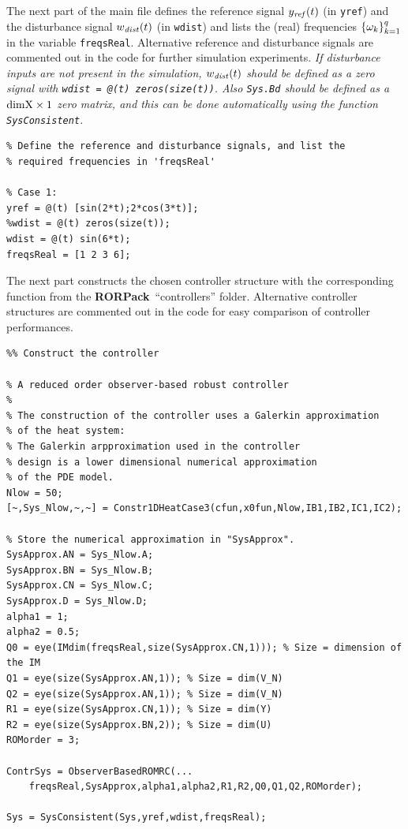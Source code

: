 \documentclass[11pt, a4paper]{amsart}
\theoremstyle{definition}
\numberwithin{equation}{section}
\newcommand{\yref}{y_{\mbox{\scriptsize\textit{ref}}}}
\newcommand{\wdist}{w_{\mbox{\scriptsize\textit{dist}}}}
\newcommand{\RORname}{\textbf{RORPack}}
\begin{document}
The next part of the main file defines the reference signal $\yref(t)$ (in \texttt{yref}) and the disturbance signal $\wdist(t)$ (in \texttt{wdist}) and lists the (real) frequencies $\{\omega_k\}_{k=1}^q$ in the variable \texttt{freqsReal}. Alternative reference and disturbance signals are commented out in the code for further simulation experiments.
\emph{If disturbance inputs are not present in the simulation, $\wdist(t)$ should be defined as a zero signal with \textup{\texttt{wdist = @(t) zeros(size(t))}}. Also \textup{\texttt{Sys.Bd}} should be defined as a $\textup{dimX}\times 1$ zero matrix, and this can be done automatically using the function \textup{\texttt{SysConsistent}}.}

\begin{lstlisting}
% Define the reference and disturbance signals, and list the
% required frequencies in 'freqsReal'

% Case 1:
yref = @(t) [sin(2*t);2*cos(3*t)];
%wdist = @(t) zeros(size(t));
wdist = @(t) sin(6*t);
freqsReal = [1 2 3 6];
\end{lstlisting}

The next part constructs the chosen controller structure with the corresponding function from the \RORname\ ``controllers'' folder. Alternative controller structures are commented out in the code for easy comparison of controller performances.

\begin{lstlisting} 
%% Construct the controller

% A reduced order observer-based robust controller
%
% The construction of the controller uses a Galerkin approximation
% of the heat system:
% The Galerkin arpproximation used in the controller
% design is a lower dimensional numerical approximation
% of the PDE model.
Nlow = 50;
[~,Sys_Nlow,~,~] = Constr1DHeatCase3(cfun,x0fun,Nlow,IB1,IB2,IC1,IC2);

% Store the numerical approximation in "SysApprox".
SysApprox.AN = Sys_Nlow.A;
SysApprox.BN = Sys_Nlow.B;
SysApprox.CN = Sys_Nlow.C;
SysApprox.D = Sys_Nlow.D;
alpha1 = 1;
alpha2 = 0.5;
Q0 = eye(IMdim(freqsReal,size(SysApprox.CN,1))); % Size = dimension of the IM 
Q1 = eye(size(SysApprox.AN,1)); % Size = dim(V_N)
Q2 = eye(size(SysApprox.AN,1)); % Size = dim(V_N)
R1 = eye(size(SysApprox.CN,1)); % Size = dim(Y)
R2 = eye(size(SysApprox.BN,2)); % Size = dim(U)
ROMorder = 3;

ContrSys = ObserverBasedROMRC(...
    freqsReal,SysApprox,alpha1,alpha2,R1,R2,Q0,Q1,Q2,ROMorder);

Sys = SysConsistent(Sys,yref,wdist,freqsReal);
\end{lstlisting}
\end{document}
